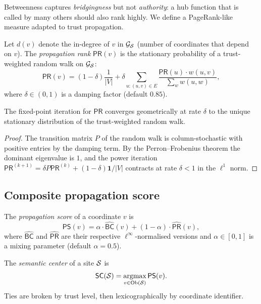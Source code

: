 \documentclass[11pt]{article}
\newcommand{\SC}{\mathsf{SC}}               %
\newcommand{\MG}{\mathcal{G}_{\Site}}       %
\newcommand{\BC}{\mathsf{BC}}               %
\newcommand{\PRank}{\mathsf{PR}}            %
\newcommand{\PropScore}{\mathsf{PS}}        %
\newcommand{\wt}{w}                         %
\begin{document}
Betweenness captures \emph{bridgingness} but not \emph{authority}:
a hub function that is called by many others should also rank highly.
We define a PageRank-like measure adapted to trust propagation.

\begin{definition}\label{def:proprank}
Let $d(v)$ denote the in-degree of $v$ in $\MG$ (number of coordinates
that depend on $v$).  The \emph{propagation rank} $\PRank(v)$ is the
stationary probability of a trust-weighted random walk on $\MG$:
\[
  \PRank(v) = (1 - \delta)\frac{1}{|V|}
              + \delta \sum_{u : (u,v) \in E}
                \frac{\PRank(u) \cdot \wt(u,v)}{\sum_{w} \wt(u,w)},
\]
where $\delta \in (0,1)$ is a damping factor (default $0.85$).
\end{definition}

\begin{proposition}\label{prop:proprank-exists}
The fixed-point iteration for $\PRank$ converges geometrically at rate
$\delta$ to the unique stationary distribution of the trust-weighted
random walk.
\end{proposition}
\begin{proof}
The transition matrix $P$ of the random walk is column-stochastic with
positive entries by the damping term.  By the Perron--Frobenius theorem
the dominant eigenvalue is $1$, and the power iteration
$\PRank^{(k+1)} = \delta P \PRank^{(k)} + (1-\delta)\mathbf{1}/|V|$
contracts at rate $\delta < 1$ in the $\ell^1$ norm.
\end{proof}

\subsection{Composite propagation score}

\begin{definition}\label{def:prop-score}
The \emph{propagation score} of a coordinate $v$ is
\[
  \PropScore(v) = \alpha \cdot \widehat{\BC}(v)
                + (1 - \alpha) \cdot \widehat{\PRank}(v),
\]
where $\widehat{\BC}$ and $\widehat{\PRank}$ are their respective
$\ell^\infty$-normalised versions and $\alpha \in [0,1]$ is a mixing
parameter (default $\alpha = 0.5$).
\end{definition}

\begin{definition}\label{def:semantic-center}
The \emph{semantic center} of a site $\mathcal{S}$ is
\[
  \SC(\Site) = \operatorname*{argmax}_{v \in \Ob(\Site)} \PropScore(v).
\]
Ties are broken by trust level, then lexicographically by coordinate
identifier.
\end{definition}
\end{document}
